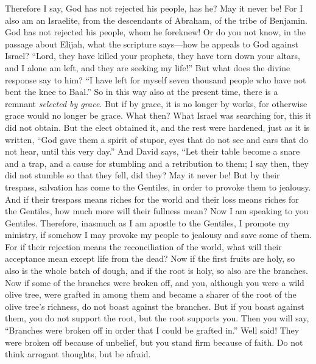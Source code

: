 \begin{biblechapter} %
 Therefore I say, God has not rejected his people, has he? May it never be! For I also am an Israelite, from the descendants of Abraham, of the tribe of Benjamin.
\verse God has not rejected his people, whom he foreknew! Or do you not know, in the passage about Elijah, what the scripture says—how he appeals to God against Israel?
\verse “Lord, they have killed your prophets, they have torn down your altars, and I alone am left, and they are seeking my life!”
\verse But what does the divine response say to him? “I have left for myself seven thousand people who have not bent the knee to Baal.”
\verse So in this way also at the present time, there is a remnant \textit{selected by grace}.
\verse But if by grace, it is no longer by works, for otherwise grace would no longer be grace.
\verse What then? What Israel was searching for, this it did not obtain. But the elect obtained it, and the rest were hardened,
\verse just as it is written, “God gave them a spirit of stupor, 
eyes that do not see and ears that do not hear, 
until this very day.”
\verse And David says,
\verse “Let their table become a snare and a trap, 
and a cause for stumbling and a retribution to them;
\verse I say then, they did not stumble so that they fell, did they? May it never be! But by their trespass, salvation has come to the Gentiles, in order to provoke them to jealousy.
\verse And if their trespass means riches for the world and their loss means riches for the Gentiles, how much more will their fullness mean?
 Now I am speaking to you Gentiles. Therefore, inasmuch as I am apostle to the Gentiles, I promote my ministry,
\verse if somehow I may provoke my people to jealousy and save some of them.
\verse For if their rejection means the reconciliation of the world, what will their acceptance mean except life from the dead?
\verse Now if the first fruits are holy, so also is the whole batch of dough, and if the root is holy, so also are the branches.
\verse Now if some of the branches were broken off, and you, although you were a wild olive tree, were grafted in among them and became a sharer of the root of the olive tree’s richness,
\verse do not boast against the branches. But if you boast against them, you do not support the root, but the root supports you.
\verse Then you will say, “Branches were broken off in order that I could be grafted in.”
\verse Well said! They were broken off because of unbelief, but you stand firm because of faith. Do not think arrogant thoughts, but be afraid.

\end{biblechapter}
